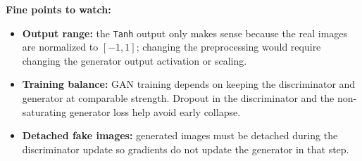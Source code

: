 \documentclass[11pt,a4paper]{article}
\begin{document}
\textbf{Fine points to watch:}

\begin{itemize}
    \item \textbf{Output range:} the \texttt{Tanh} output only makes sense because the real images are normalized to $[-1,1]$; changing the preprocessing would require changing the generator output activation or scaling.
    \item \textbf{Training balance:} GAN training depends on keeping the discriminator and generator at comparable strength. Dropout in the discriminator and the non-saturating generator loss help avoid early collapse.
    \item \textbf{Detached fake images:} generated images must be detached during the discriminator update so gradients do not update the generator in that step.
\end{itemize}
\end{document}
